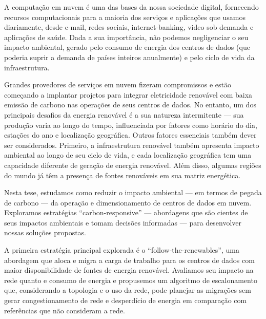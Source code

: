 A computação em nuvem é uma das bases da nossa sociedade digital, fornecendo recursos computacionais para a maioria dos serviços e aplicações que usamos diariamente, desde e-mail, redes sociais, internet-banking, video sob demanda e aplicações de saúde. Dada a sua importância, não podemos negligenciar o seu impacto ambiental, gerado pelo consumo de energia dos centros de dados (que poderia suprir a demanda de países inteiros anualmente) e pelo ciclo de vida da infraestrutura.

Grandes provedores de serviços em nuvem fizeram compromissos e estão começando a implantar projetos para integrar eletricidade renovável com baixa emissão de carbono nas operações de seus centros de dados. No entanto, um dos principais desafios da energia renovável é a sua natureza intermitente --- sua produção varia ao longo do tempo, influenciada por fatores como horário do dia, estações do ano e localização geográfica. Outros fatores essenciais também dever ser considerados. Primeiro, a infraestrutura renovável também apresenta impacto ambiental ao longo de seu ciclo de vida, e cada localização geográfica tem uma capacidade diferente de geração de energia renovável. Além disso, algumas regiões do mundo já têm a presença de fontes renováveis em sua matriz energética.


Nesta tese, estudamos como reduzir o impacto ambiental --- em termos de pegada de carbono --- da operação e dimensionamento de centros de dados em nuvem. Exploramos estratégias ``carbon-responsive'' --- abordagens que são cientes de seus impactos ambientais e tomam decisões informadas --- para desenvolver nossas soluções propostas.

A primeira estratégia principal explorada é o ``follow-the-renewables'', uma abordagem que aloca e migra a carga de trabalho para os centros de dados com maior disponibilidade de fontes de energia renovável. Avaliamos seu impacto na rede quanto e consumo de energia e propusemos um algoritmo de escalonamento que, considerando a topologia  e o uso da rede, pode planejar as migrações sem gerar congestionamento de rede e desperdício de energia em comparação com referências que não consideram a rede.

